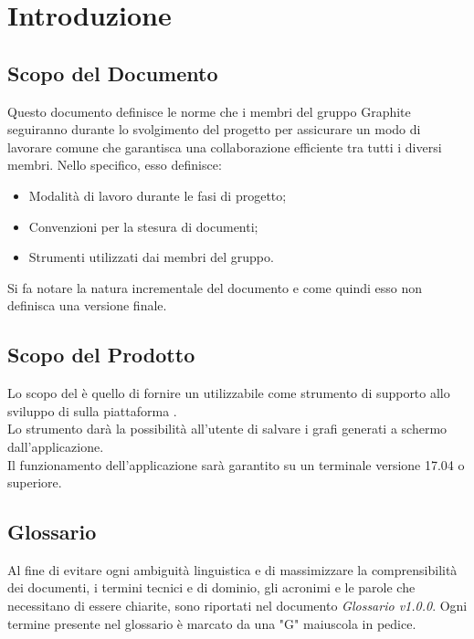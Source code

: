 \documentclass[./NormediProgetto.tex]{subfiles}
\begin{document}
	
\chapter{Introduzione}

\section{Scopo del Documento}

Questo documento definisce le norme che i membri del gruppo Graphite seguiranno durante lo svolgimento del progetto per assicurare un modo di lavorare comune che garantisca una collaborazione efficiente tra tutti i diversi
membri. Nello specifico, esso definisce:

\begin{itemize}
	\item Modalità di lavoro durante le fasi di progetto;
	\item Convenzioni per la stesura di documenti;
	\item Strumenti utilizzati dai membri del gruppo.
\end{itemize}
Si fa notare la natura incrementale del documento e come quindi esso non definisca una versione finale.
\section{Scopo del Prodotto}

Lo scopo del  è quello di fornire un  utilizzabile come strumento di supporto allo sviluppo di  sulla piattaforma . 
\\ \noindent Lo strumento darà la possibilità all'utente di salvare i grafi generati a schermo dall'applicazione.
\\ \noindent Il funzionamento dell'applicazione sarà garantito su un terminale  versione 17.04 o superiore.

\section{Glossario}

Al fine di evitare ogni ambiguità linguistica e di massimizzare la comprensibilità dei documenti, i termini tecnici e di dominio, gli acronimi e le parole che necessitano di essere chiarite, sono riportati nel documento \textit{Glossario v1.0.0}.
Ogni termine presente nel glossario è marcato da una "G" maiuscola in pedice.
\end{document}
